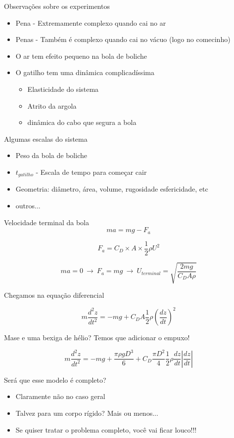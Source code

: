 \documentclass{beamer}
\begin{document}
\begin{frame}{Observações sobre os experimentos}
  \begin{itemize}
  \item Pena - Extremamente complexo quando cai no ar
  \item Penas - Também é complexo quando cai no vácuo (logo no comecinho)
  \item O ar tem efeito pequeno na bola de boliche
  \item O gatilho tem uma dinâmica complicadíssima
    \begin{itemize}
    \item Elasticidade do sistema
    \item Atrito da argola
    \item dinâmica do cabo que segura a bola
    \end{itemize}
  \end{itemize}
\end{frame}  

\begin{frame}{Algumas escalas do sistema}
  \begin{itemize}
  \item Peso da bola de boliche
  \item $t_{gatilho}$ - Escala de tempo para começar cair
  \item Geometria: diâmetro, área, volume, rugosidade esfericidade, etc
  \item outros...
  \end{itemize}
\end{frame}

\begin{frame}{Velocidade terminal da bola}
\[
ma = mg - F_a
\]

\[
F_a = C_D \times A \times \frac{1}{2}\rho U^2
\]

\[
ma = 0  \: \longrightarrow \: F_a = mg \: \longrightarrow \: U_{terminal} = \sqrt{\frac{2 m g}{C_D A \rho}}
\]

Chegamos na equação diferencial

\[m \frac{d^2 z}{dt^2} = -mg + C_D A \frac{1}{2} \rho \left(\frac{dz}{dt}\right)^2\]


\end{frame}
  

\begin{frame}{Mase e uma bexiga de hélio?}
Temos que adicionar o empuxo!

\[m \frac{d^2 z}{dt^2} = -mg + \frac{\pi \rho g D^3}{6} + C_D \frac{\pi D^2}{4} \frac{1}{2} \rho \frac{dz}{dt}\left|\frac{dz}{dt}\right|\]

Será que esse modelo é completo?
\begin{itemize}
\item Claramente não no caso geral
\item Talvez para um corpo rígido? Mais ou menos...
\item Se quiser tratar o problema completo, você vai ficar louco!!!
\end{itemize}
\end{frame}
\end{document}
